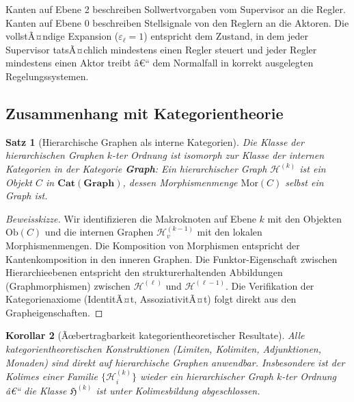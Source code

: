 ﻿\documentclass[12pt,a4paper,twoside]{article}
\theoremstyle{definition}
\theoremstyle{plain}
\newtheorem{theorem}{Satz}[section]
\newtheorem{korollar}[theorem]{Korollar}
\theoremstyle{remark}
\begin{document}
Kanten auf Ebene 2 beschreiben Sollwertvorgaben vom Supervisor an
die Regler.  Kanten auf Ebene 0 beschreiben Stellsignale von den
Reglern an die Aktoren.  Die vollstÃ¤ndige Expansion
($\varepsilon_\ell = 1$) entspricht dem Zustand, in dem jeder
Supervisor tatsÃ¤chlich mindestens einen Regler steuert und jeder
Regler mindestens einen Aktor treibt â€“ dem Normalfall in korrekt
ausgelegten Regelungssystemen.

\subsection{Zusammenhang mit Kategorientheorie}
\label{sub:kategorien}

\begin{theorem}[Hierarchische Graphen als interne Kategorien]
	\label{thm:kat}
	Die Klasse der hierarchischen Graphen $k$-ter Ordnung ist isomorph
	zur Klasse der \emph{internen Kategorien} in der Kategorie
	\textbf{Graph}: Ein hierarchischer Graph $\mathcal{H}^{(k)}$ ist
	ein Objekt $C$ in $\mathbf{Cat}(\mathbf{Graph})$, dessen Morphismenmenge
	$\mathrm{Mor}(C)$ selbst ein Graph ist.
\end{theorem}

\begin{proof}[Beweisskizze]
	Wir identifizieren die Makroknoten auf Ebene $k$ mit den Objekten
	$\mathrm{Ob}(C)$ und die internen Graphen $\mathcal{H}^{(k-1)}_v$
	mit den lokalen Morphismenmengen.  Die Komposition von Morphismen
	entspricht der Kantenkomposition in den inneren Graphen.
	Die Funktor-Eigenschaft zwischen Hierarchieebenen entspricht den
	strukturerhaltenden Abbildungen (Graphmorphismen) zwischen
	$\mathcal{H}^{(\ell)}$ und $\mathcal{H}^{(\ell-1)}$.
	Die Verifikation der Kategorienaxiome (IdentitÃ¤t, AssoziativitÃ¤t)
	folgt direkt aus den Grapheigenschaften.\qquad
\end{proof}

\begin{korollar}[Ãœbertragbarkeit kategorientheoretischer Resultate]
	\label{kor:transfer}
	Alle kategorientheoretischen Konstruktionen (Limiten, Kolimiten,
	Adjunktionen, Monaden) sind direkt auf hierarchische Graphen
	anwendbar.  Insbesondere ist der Kolimes einer Familie
	$\{\mathcal{H}^{(k)}_i\}$ wieder ein hierarchischer Graph $k$-ter
	Ordnung â€“ die Klasse $\mathfrak{H}^{(k)}$ ist unter Kolimesbildung
	abgeschlossen.
\end{korollar}
\end{document}
